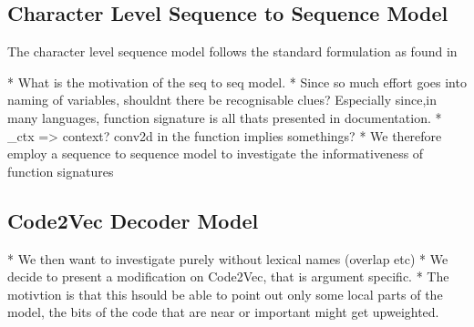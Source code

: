 








\subsection{Character Level Sequence to Sequence Model} %
\label{sec:character_level_sequence_to_sequence}

The character level sequence model follows the standard formulation as found in \cite{bahdanau_neural_2014}

* What is the motivation of the seq to seq model.
* Since so much effort goes into naming of variables, shouldnt there be recognisable clues? Especially since,in many languages, function signature is all thats presented in documentation.
* \_ctx => context? conv2d in the function implies somethings?
* We therefore employ a sequence to sequence model to investigate the informativeness of function signatures




\subsection{Code2Vec Decoder Model} %
\label{sec:code2vec_decoder_model}

* We then want to investigate purely without lexical names (overlap etc)
* We decide to present a modification on Code2Vec, that is argument specific.
* The motivtion is that this hsould be able to point out only some local parts of the model, the bits of the code that are near or important might get upweighted.


